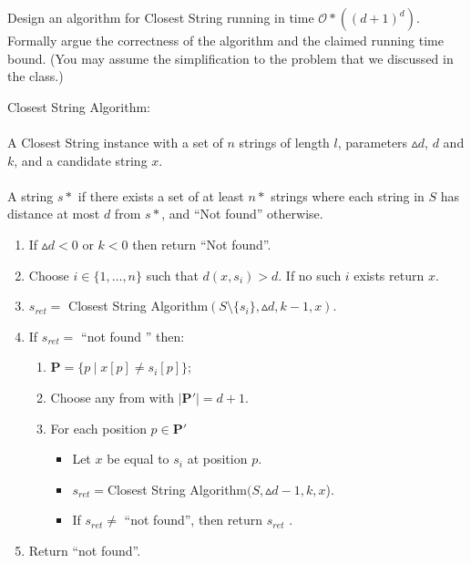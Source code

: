 \documentclass[11pt]{exam}
\begin{document}
\begin{questions}
\question Design an algorithm for Closest String running in time $\mathcal{O} * ((d + 1)^d )$. Formally argue the correctness of the algorithm and the claimed running time bound. (You may assume the simplification to the problem that we discussed in the class.)
\begin{solution}
    Closest String Algorithm:\\\\
     A Closest String instance with a set of  $n$ strings of length $l$, parameters $\vartriangle d$, $d$ and $k$, and a candidate string $x$.\\\\
     A string $s*$ if there exists a set  of at least $n*$ strings where each string in $S$ has distance at most $d$ from $s*$, and “Not found” otherwise.\\
    \begin{enumerate}
        \item If $\vartriangle d < 0$ or $k < 0$ then return “Not found”.
        \item Choose $i \in \{1,…, n\}$ such that $d(x, s_i) > d$. If no such $i$ exists return $x$.
        \item $s_{ret} =$ Closest String Algorithm$(S\setminus \{s_i\}, \vartriangle d, k - 1, x)$. 
        \item If $s_{ret} =$ “not found ” then:
        \begin{enumerate}
            \item $\pmb{P} = \{p \:|\; x[p] \neq s_i [p]\}$;
            \item Choose any  from  with $|\pmb{P}'| = d + 1$.
            \item For each position $p \in \pmb{P}'$
            \begin{itemize}
                \item Let $x$ be equal to $s_i$ at position $p$.
                \item $s_{ret} =$Closest String  Algorithm$(S, \vartriangle{d - 1}, k, x$).
                \item If $s_{ret} \neq$ “not found”, then return $s_{ret}$ .
            \end{itemize}
        \end{enumerate}
        \item Return “not found”.
    \end{enumerate}
    

\end{solution}
\end{questions}
\end{document}
